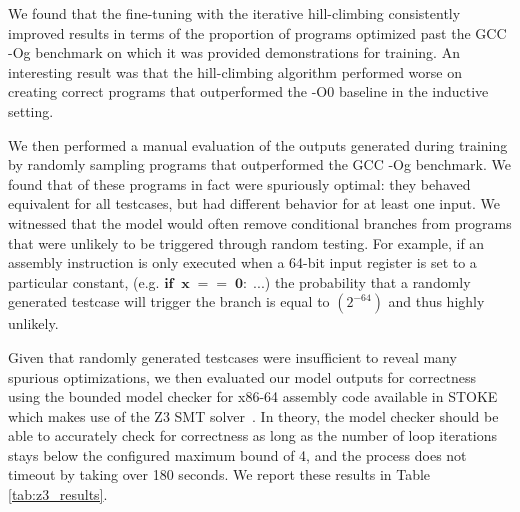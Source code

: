 \documentclass{article}
\begin{document}
We found that the fine-tuning with the iterative hill-climbing consistently improved results in terms of the proportion of programs optimized past the GCC -Og benchmark on which it was provided demonstrations for training. An interesting result was that the hill-climbing algorithm performed worse on creating correct programs that outperformed the -O0 baseline in the inductive setting. 

We then performed a manual evaluation of the outputs generated during training by randomly sampling  programs that outperformed the GCC -Og benchmark. We found that  of these programs in fact were spuriously optimal: they behaved equivalent for all testcases, but had different behavior for at least one input. We witnessed that the model would often remove conditional branches from programs that were unlikely to be triggered through random testing.
%
For example, if an assembly instruction is only executed when a 64-bit input register is set to a particular constant,  
(e.g. $\textbf{if} \;\; \mathbf{x\;==\;0:\; ...}$)
the probability that a randomly generated testcase will trigger the branch is equal to $(2^{-64})$ and thus highly unlikely. 

Given that randomly generated testcases were insufficient to reveal many spurious optimizations, we then evaluated our model outputs for correctness using the  bounded model checker for x86-64 assembly code available in \textsc{STOKE} which makes use of the Z3 SMT solver~\cite{de2008z3}. 
In theory, the model checker should be able to accurately check for correctness as long as the number of loop iterations stays below the configured maximum bound of 4, and the process does not timeout by taking over 180 seconds.
We report these results in Table \ref{tab:z3_results}.  
\end{document}
